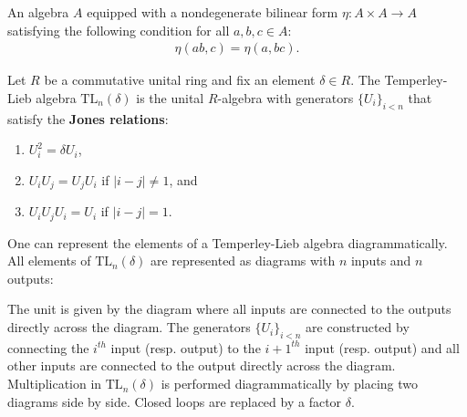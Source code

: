     \begin{example}\label{linalgebra:frobenius}
        An algebra $A$ equipped with a nondegenerate bilinear form $\eta:A\times A\rightarrow A$ satisfying the following condition for all $a,b,c\in A$:
        \begin{gather}
            \eta(ab,c)=\eta(a,bc).
        \end{gather}
    \end{example}

    \begin{example}
        Let $R$ be a commutative unital ring and fix an element $\delta\in R$. The Temperley-Lieb algebra $\text{TL}_n(\delta)$ is the unital $R$-algebra with generators $\{U_i\}_{i<n}$ that satisfy the \textbf{Jones relations}:
        \begin{enumerate}
            \item $U_i^2 = \delta U_i$,
            \item $U_i U_j = U_j U_i$ if $|i-j|\neq 1$, and
            \item $U_i U_j U_i = U_i$ if $|i-j| = 1$.
        \end{enumerate}
        One can represent the elements of a Temperley-Lieb algebra diagrammatically. All elements of $\text{TL}_n(\delta)$ are represented as diagrams with $n$ inputs and $n$ outputs:

        \qquad The unit is given by the diagram where all inputs are connected to the outputs directly across the diagram. The generators $\{U_i\}_{i<n}$ are constructed by connecting the $i^{th}$ input (resp. output) to the $i+1^{th}$ input (resp. output) and all other inputs are connected to the output directly across the diagram.
        Multiplication in $\text{TL}_n(\delta)$ is performed diagrammatically by placing two diagrams side by side. Closed loops are replaced by a factor $\delta$.


\end{example}

